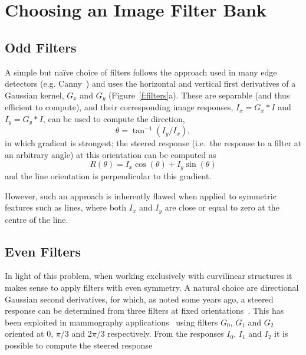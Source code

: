 \documentclass[runningheads,a4paper]{llncs}
\newcommand{\fref}[1]{Figure~\ref{#1}}
\def\Gx{G_x}
\def\Gy{G_y}
\def\Ix{I_x}
\def\Iy{I_y}
\def\ie{i.e.}
\newcommand{\comment}[1]{}
\begin{document}
\section{Choosing an Image Filter Bank}

\subsection{Odd Filters}
\label{s:odd_filters}
A simple but na\"ive choice of filters follows the approach used in many edge detectors (e.g. Canny~\cite{Canny_PAMI86}) and uses the horizontal and vertical first derivatives of a Gaussian kernel, $\Gx$ and $\Gy$ (\fref{f:filters}a). These are separable (and thus efficient to compute), and their corresponding image responses, $\Ix=\Gx\ast I$ and $\Iy=\Gy\ast I$, can be used to compute the direction,
%
\begin{equation}
\theta = \tan^{-1}(\Iy/\Ix),
\label{e:1d}
\end{equation}
%
\noindent in which gradient is strongest; the steered response (\ie~the response to a filter at an arbitrary angle) at this orientation can be computed as
%
\begin{equation}
R(\theta) = \Ix \cos(\theta) + \Iy \sin(\theta)
\label{e:r1}
\end{equation}
%
\noindent and the line orientation is perpendicular to this gradient.

However, such an approach is inherently flawed when applied to symmetric features such as lines, where both $\Ix$ and $\Iy$ are close or equal to zero at the centre of the line. \comment{As such the orientation is not defined. Despite this we note that first derivatives are frequently used to estimate the orientation of linear structures [citations? examples?] - or maybe not? can't realy find any applicable examples..}

\subsection{Even Filters}
\label{s:even_filters}
In light of this problem, when working exclusively with curvilinear structures it makes sense to apply filters with even symmetry. A natural choice are directional Gaussian second derivatives, for which, as noted some years ago, a steered response can be determined from three filters at fixed orientations~\cite{Freeman_Adelson_TPAMI91,Koenderink_vanDoorn_TPAMI92}. This has been exploited in mammography applications~\cite{Karssemeijer_teBrake_TMI96} using filters $G_0$, $G_1$ and $G_2$ oriented at 0, $\pi /3$ and $2\pi/3$ respectively. From the responses $I_0$, $I_1$ and $I_2$ it is possible to compute the steered response
\end{document}
